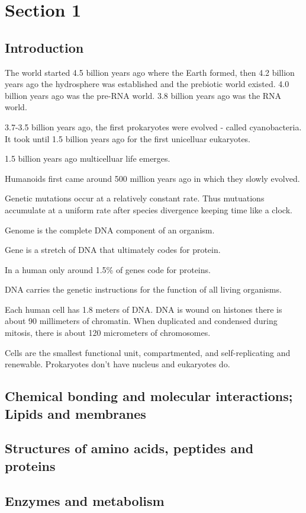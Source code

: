 \documentclass[../bio.tex]{subfiles}
\begin{document}
\chapter{Section 1}
\section{Introduction}
The world started 4.5 billion years ago where the Earth formed, then 
4.2 billion years ago the hydrosphere was established and the prebiotic world existed. 
4.0 billion years ago was the pre-RNA world. 3.8 billion years ago was the RNA world.

3.7-3.5 billion years ago, the first prokaryotes were evolved - 
called cyanobacteria. It took until 1.5 billion years ago for the 
first unicelluar eukaryotes. 

1.5 billion years ago multicelluar life emerges. 

Humanoids first came around 500 million years ago in which they slowly evolved.

Genetic mutations occur at a relatively constant rate. Thus mutuations 
accumulate at a uniform rate after species divergence keeping time like a clock.

Genome is the complete DNA component of an organism.

Gene is a stretch of DNA that ultimately codes for protein.

In a human only around 1.5\% of genes code for proteins.

DNA carries the genetic instructions for the function of all living organisms.

Each human cell has 1.8 meters of DNA. DNA is wound on histones there is 
about 90 millimeters of chromatin. When duplicated and condensed during mitosis, 
there is about 120 micrometers of chromosomes. 

Cells are the smallest functional unit, compartmented, and self-replicating and renewable. 
Prokaryotes don't have nucleus and eukaryotes do.

\section{Chemical bonding and molecular interactions; Lipids and membranes}
\section{Structures of amino acids, peptides and proteins}
\section{Enzymes and metabolism}
\end{document}
